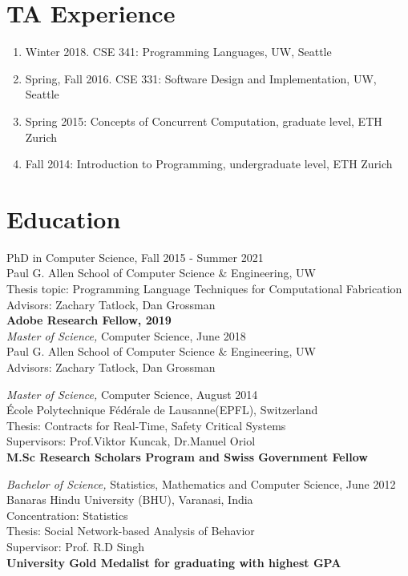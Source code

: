\documentclass[margin, 10pt]{res} %
\begin{document}
\begin{resume}
\section{TA Experience}
\begin{enumerate}
\item Winter 2018. CSE 341: Programming Languages, UW, Seattle
\item Spring, Fall 2016. CSE 331: Software Design and Implementation, UW, Seattle
\item Spring 2015: Concepts of Concurrent Computation, graduate level, ETH Zurich
\item Fall 2014: Introduction to Programming, undergraduate level, ETH Zurich
\end{enumerate}


\section{Education}

PhD in Computer Science, Fall 2015 - Summer 2021 \\
Paul G. Allen School of Computer Science \& Engineering, UW \\
Thesis topic: Programming Language Techniques for Computational Fabrication \\
Advisors: Zachary Tatlock, Dan Grossman\\
\textbf{Adobe Research Fellow, 2019} \\

{\sl Master of Science,} Computer Science, June 2018 \\
Paul G. Allen School of Computer Science \& Engineering, UW \\
Advisors: Zachary Tatlock, Dan Grossman

{\sl Master of Science,} Computer Science, August 2014 \\
\'{E}cole Polytechnique F\'{e}d\'{e}rale de Lausanne(EPFL), Switzerland \\
Thesis: Contracts for Real-Time, Safety Critical Systems \\Supervisors: Prof.Viktor Kuncak, Dr.Manuel Oriol\\
\textbf{M.Sc Research Scholars Program and Swiss Government Fellow}

{\sl Bachelor of Science,} Statistics, Mathematics and Computer Science, June 2012 \\
Banaras Hindu University (BHU), Varanasi, India \\
Concentration: Statistics \\
Thesis: Social Network-based Analysis of Behavior \\ Supervisor: Prof. R.D Singh\\
\textbf{University Gold Medalist for graduating with highest GPA}


\end{resume}
\end{document}
